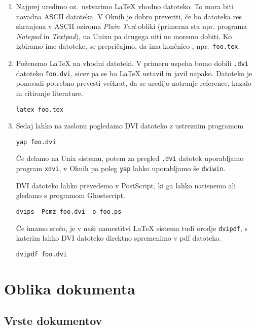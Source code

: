 \begin{enumerate}
\item 
  
  Najprej uredimo oz.~ustvarimo \LaTeX{} vhodno datoteko. To mora biti navadna ASCII
  datoteka. V Oknih je dobro preveriti, če bo datoteka res shranjena v ASCII oziroma 
  \emph{Plain Text} obliki (primerna sta npr. programa \emph{Notepad} 
  in \emph{Textpad}), 
  na Unixu pa drugega niti ne moremo dobiti.  
  Ko izbiramo ime datoteke, se prepričajmo, 
  da ima končnico , npr.~\texttt{foo.tex}.


\item 

Poženemo \LaTeX{} na vhodni datoteki. V primeru uspeha bomo dobili 
\texttt{.dvi} datoteko \texttt{foo.dvi}, sicer pa se bo \LaTeX{} 
ustavil in javil napako. Datoteko je ponavadi potrebno prevesti 
večkrat, da se uredijo notranje reference, kazalo in 
citiranje literature. 
\begin{lscommand}
\verb+latex foo.tex+
\end{lscommand}


\item 
Sedaj lahko na zaslonu pogledamo DVI datoteko z ustreznim programom
\begin{lscommand}
\verb+yap foo.dvi+
\end{lscommand}
 Če delamo na 
Unix sistemu, potem za pregled \texttt{.dvi} datotek uporabljamo program
\texttt{xdvi}, v Oknih pa poleg \texttt{yap} lahko uporabljamo še \texttt{dviwin}.

DVI datoteko lahko prevedemo v PostScript, ki ga lahko natisnemo ali
gledamo s programom Ghostscript.
\begin{lscommand}
\verb+dvips -Pcmz foo.dvi -o foo.ps+
\end{lscommand}

Če imamo srečo, je v naši namestitvi \LaTeX{} sistema
tudi orodje
 \texttt{dvipdf}, s katerim lahko DVI datoteko direktno
spremenimo v pdf datoteko.
\begin{lscommand}
\verb+dvipdf foo.dvi+
\end{lscommand}


\end{enumerate}

 
\section{Oblika dokumenta}
 
\subsection {Vrste dokumentov}\label{sec:documentclass}


